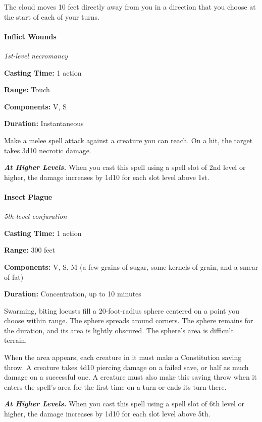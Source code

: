 \documentclass[
]{article}
\begin{document}
The cloud moves 10 feet directly away from you in a direction that you
choose at the start of each of your turns.

\hypertarget{inflict-wounds}{%
\paragraph{Inflict Wounds}\label{inflict-wounds}}

\emph{1st-level necromancy}

\textbf{Casting Time:} 1 action

\textbf{Range:} Touch

\textbf{Components:} V, S

\textbf{Duration:} Instantaneous

Make a melee spell attack against a creature you can reach. On a hit,
the target takes 3d10 necrotic damage.

\emph{\textbf{At Higher Levels.}} When you cast this spell using a spell
slot of 2nd level or higher, the damage increases by 1d10 for each slot
level above 1st.

\hypertarget{insect-plague}{%
\paragraph{Insect Plague}\label{insect-plague}}

\emph{5th-level conjuration}

\textbf{Casting Time:} 1 action

\textbf{Range:} 300 feet

\textbf{Components:} V, S, M (a few grains of sugar, some kernels of
grain, and a smear of fat)

\textbf{Duration:} Concentration, up to 10 minutes

Swarming, biting locusts fill a 20-foot-radius sphere centered on a
point you choose within range. The sphere spreads around corners. The
sphere remains for the duration, and its area is lightly obscured. The
sphere's area is difficult terrain.

When the area appears, each creature in it must make a Constitution
saving throw. A creature takes 4d10 piercing damage on a failed save, or
half as much damage on a successful one. A creature must also make this
saving throw when it enters the spell's area for the first time on a
turn or ends its turn there.

\emph{\textbf{At Higher Levels.}} When you cast this spell using a spell
slot of 6th level or higher, the damage increases by 1d10 for each slot
level above 5th.
\end{document}

